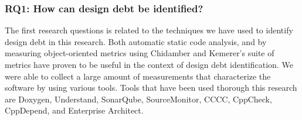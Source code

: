 










\subsubsection{RQ1: How can design debt be identified?} 
The first research questions is related to the techniques we have used to identify design debt in this research. Both automatic static code analysis, and by measuring object-oriented metrics using Chidamber and Kemerer's suite of metrics have proven to be useful in the context of design debt identification. We were able to collect a large amount of measurements that characterize the software by using various tools. Tools that have been used thorough this research are Doxygen, Understand, SonarQube, SourceMonitor, CCCC, CppCheck, CppDepend, and Enterprise Architect.

